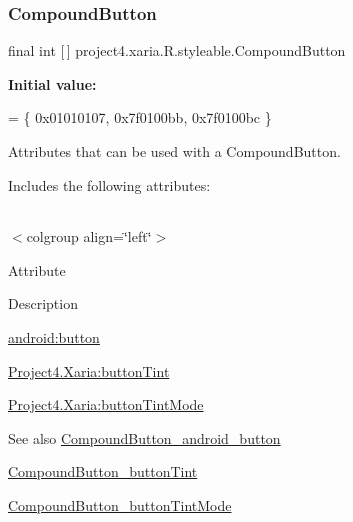 \subsubsection{\texorpdfstring{Compound\+Button}{CompoundButton}}
{\footnotesize\ttfamily final int \mbox{[}$\,$\mbox{]} project4.\+xaria.\+R.\+styleable.\+Compound\+Button\hspace{0.3cm}{\ttfamily [static]}}

{\bfseries Initial value\+:}
\begin{DoxyCode}
= \{
            0x01010107, 0x7f0100bb, 0x7f0100bc
        \}
\end{DoxyCode}
Attributes that can be used with a Compound\+Button. 

Includes the following attributes\+:

\tabulinesep=1mm
\begin{longtabu} spread 0pt [c]{*{0}{|X[-1]}|}
\hline
\end{longtabu}
$<$colgroup align=\char`\"{}left\char`\"{}$>$ 

Attribute

Description 

{\ttfamily \hyperlink{classproject4_1_1xaria_1_1R_1_1styleable_ab9acf4ab65ae29d7295148e85f0d4d06}{android\+:button}}

{\ttfamily \hyperlink{classproject4_1_1xaria_1_1R_1_1styleable_a2267569338e26b9552f290f79da5b8b0}{Project4.\+Xaria\+:button\+Tint}}

{\ttfamily \hyperlink{classproject4_1_1xaria_1_1R_1_1styleable_abfde535b5a5d50cc904acf3e419894fb}{Project4.\+Xaria\+:button\+Tint\+Mode}}

\begin{DoxySeeAlso}{See also}
\hyperlink{classproject4_1_1xaria_1_1R_1_1styleable_ab9acf4ab65ae29d7295148e85f0d4d06}{Compound\+Button\+\_\+android\+\_\+button} 

\hyperlink{classproject4_1_1xaria_1_1R_1_1styleable_a2267569338e26b9552f290f79da5b8b0}{Compound\+Button\+\_\+button\+Tint} 

\hyperlink{classproject4_1_1xaria_1_1R_1_1styleable_abfde535b5a5d50cc904acf3e419894fb}{Compound\+Button\+\_\+button\+Tint\+Mode} 
\end{DoxySeeAlso}
\mbox{\label{classproject4_1_1xaria_1_1R_1_1styleable_ab9acf4ab65ae29d7295148e85f0d4d06}} 

